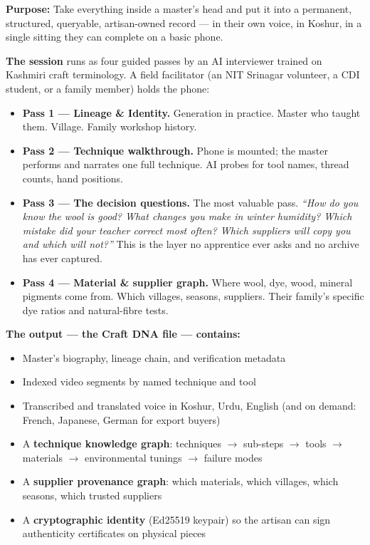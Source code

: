 \documentclass[11pt, a4paper]{article}
\begin{document}
\begin{layerbox}

\textbf{Purpose:} Take everything inside a master's head and put it into a permanent, structured, queryable, artisan-owned record --- in their own voice, in Koshur, in a single sitting they can complete on a basic phone.

\textbf{The session} runs as four guided passes by an AI interviewer trained on Kashmiri craft terminology. A field facilitator (an NIT Srinagar volunteer, a CDI student, or a family member) holds the phone:

\begin{itemize}
  \item \textbf{Pass 1 --- Lineage \& Identity.} Generation in practice. Master who taught them. Village. Family workshop history.
  \item \textbf{Pass 2 --- Technique walkthrough.} Phone is mounted; the master performs and narrates one full technique. AI probes for tool names, thread counts, hand positions.
  \item \textbf{Pass 3 --- The decision questions.} The most valuable pass. {\itshape ``How do you know the wool is good? What changes you make in winter humidity? Which mistake did your teacher correct most often? Which suppliers will copy you and which will not?''} This is the layer no apprentice ever asks and no archive has ever captured.
  \item \textbf{Pass 4 --- Material \& supplier graph.} Where wool, dye, wood, mineral pigments come from. Which villages, seasons, suppliers. Their family's specific dye ratios and natural-fibre tests.
\end{itemize}

\textbf{The output --- the Craft DNA file --- contains:}

\begin{itemize}
  \item Master's biography, lineage chain, and verification metadata
  \item Indexed video segments by named technique and tool
  \item Transcribed and translated voice in Koshur, Urdu, English (and on demand: French, Japanese, German for export buyers)
  \item A \textbf{technique knowledge graph}: techniques $\to$ sub-steps $\to$ tools $\to$ materials $\to$ environmental tunings $\to$ failure modes
  \item A \textbf{supplier provenance graph}: which materials, which villages, which seasons, which trusted suppliers
  \item A \textbf{cryptographic identity} (Ed25519 keypair) so the artisan can sign authenticity certificates on physical pieces
\end{itemize}


\end{layerbox}
\end{document}
